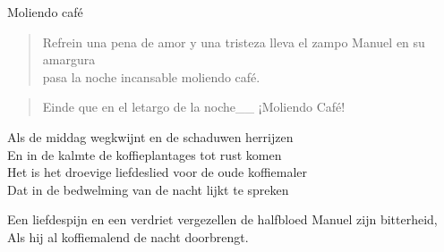 \begin{song}[tropical]{Moliendo café}
\begin{verse}{Refrein}
una pena de amor y una tristeza lleva el zampo Manuel en su amargura\\
pasa la noche incansable moliendo café.\hspace{1em}\chord{$\downarrow\downarrow$}\hspace{1.5em}\chord{$\downarrow\downarrow$}
\end{verse}

\begin{verse}{Einde}
que en el letargo de la noche\_\_ ¡Moliendo Café!
\end{verse}
\end{song}

\clearpage
\begin{translation}
Als de middag wegkwijnt en de schaduwen herrijzen\\
En in de kalmte de koffieplantages tot rust komen\\
Het is het droevige liefdeslied voor de oude koffiemaler\\
Dat in de bedwelming van de nacht lijkt te spreken\vspace{\wlskip}

Een liefdespijn en een verdriet vergezellen de halfbloed Manuel zijn bitterheid,\\
Als hij al koffiemalend de nacht doorbrengt.\\
\end{translation}

